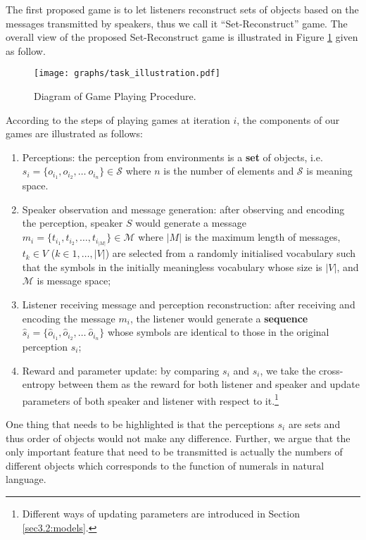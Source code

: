  The first proposed game is to let listeners reconstruct sets of objects based on the messages transmitted by speakers, thus we call it ``Set-Reconstruct'' game. The overall view of the proposed Set-Reconstruct game is illustrated in Figure \ref{fig2:game_procedure} given as follow.

\begin{figure}[!h]
  \centering
  \texttt{[image: graphs/task\_illustration.pdf]}
  \caption{Diagram of Game Playing Procedure.}
  \label{fig2:game_procedure}
\end{figure}

According to the steps of playing games at iteration $i$, the components of our games are illustrated as follows:
\begin{enumerate}
  \item Perceptions: the perception from environments is a \textbf{set} of objects, i.e. $s_i=\{o_{i_1}, o_{i_2}, \dots\ o_{i_n}\} \in \mathcal{S}$ where $n$ is the number of elements and $\mathcal{S}$ is meaning space.
  \item Speaker observation and message generation: after observing and encoding the perception, speaker $S$ would generate a message $m_i=\{t_{i_1}, t_{i_2}, \dots, t_{i_{|M|}}\} \in \mathcal{M}$ where $|M|$ is the maximum length of messages, $t_k \in V$ ($k \in {1, \dots, |V|}$) are selected from a randomly initialised vocabulary such that the symbols in the initially meaningless vocabulary whose size is $|V|$, and $\mathcal{M}$ is message space;
  \item Listener receiving message and perception reconstruction: after receiving and encoding the message $m_i$, the listener would generate a \textbf{sequence} $\hat{s}_i = \{\hat{o}_{i_1}, \hat{o}_{i_2}, \dots\ \hat{o}_{i_n}\}$ whose symbols are identical to those in the original perception $s_i$;
  \item Reward and parameter update: by comparing $s_i$ and $\hat{s}_i$, we take the cross-entropy between them as the reward for both listener and speaker and update parameters of both speaker and listener with respect to it.\footnote{Different ways of updating parameters are introduced in Section \ref{sec3.2:models}.}
\end{enumerate}

One thing that needs to be highlighted is that the perceptions $s_i$ are sets and thus order of objects would not make any difference. Further, we argue that the only important feature that need to be transmitted is actually the numbers of different objects which corresponds to the function of numerals in natural language.

